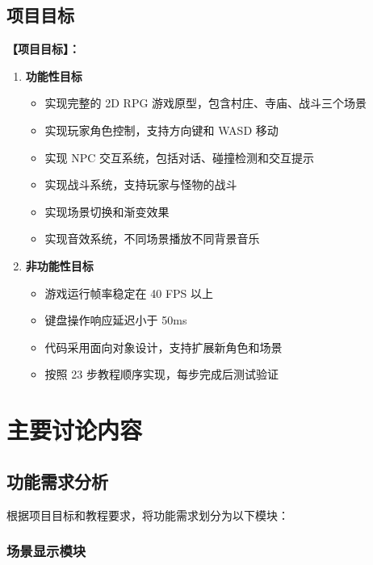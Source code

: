 \documentclass[12pt,a4paper]{article}
\begin{document}
\subsection{项目目标}
\textbf{【项目目标】：}
\begin{enumerate}[label=\arabic*.]
    \item \textbf{功能性目标}
    \begin{itemize}
        \item 实现完整的 2D RPG 游戏原型，包含村庄、寺庙、战斗三个场景
        \item 实现玩家角色控制，支持方向键和 WASD 移动
        \item 实现 NPC 交互系统，包括对话、碰撞检测和交互提示
        \item 实现战斗系统，支持玩家与怪物的战斗
        \item 实现场景切换和渐变效果
        \item 实现音效系统，不同场景播放不同背景音乐
    \end{itemize}
    \item \textbf{非功能性目标}
    \begin{itemize}
        \item 游戏运行帧率稳定在 40 FPS 以上
        \item 键盘操作响应延迟小于 50ms
        \item 代码采用面向对象设计，支持扩展新角色和场景
        \item 按照 23 步教程顺序实现，每步完成后测试验证
    \end{itemize}
\end{enumerate}

\section{主要讨论内容}

\subsection{功能需求分析}

根据项目目标和教程要求，将功能需求划分为以下模块：

\subsubsection{场景显示模块}
\end{document}
